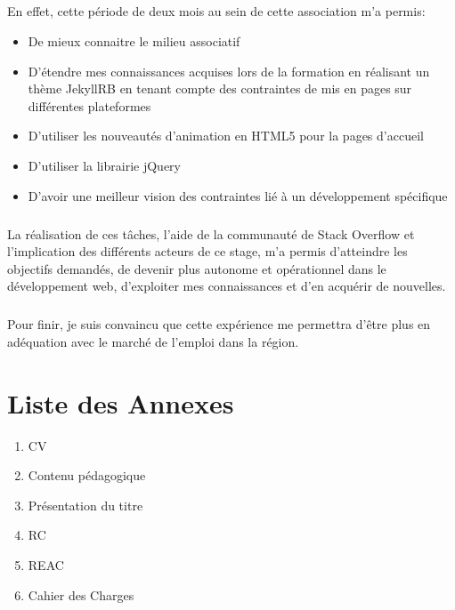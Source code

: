 \documentclass[11pt,a4paper]{report}
\begin{document}
	\paragraph*{}En effet, cette période de deux mois au sein de cette association m'a permis:
	\begin{itemize}
		\item De mieux connaitre le milieu associatif
		\item D'étendre mes connaissances acquises lors de la formation en réalisant un thème JekyllRB en tenant compte des contraintes de mis en pages sur différentes plateformes
		\item D'utiliser les nouveautés d'animation en HTML5 pour la pages d'accueil
		\item D'utiliser la librairie jQuery
		\item D'avoir une meilleur vision des contraintes lié à un développement spécifique
	\end{itemize}
	\paragraph*{}La réalisation de ces tâches, l'aide de la communauté de Stack Overflow et l'implication des différents acteurs de ce stage, m'a permis d'atteindre les objectifs demandés, de devenir plus autonome et opérationnel dans le développement web, d'exploiter mes connaissances et d'en acquérir de nouvelles.
	\paragraph*{}Pour finir, je suis convaincu que cette expérience me permettra d'être plus en adéquation avec le marché de l'emploi dans la région.

\chapter{Liste des Annexes}
	\begin{enumerate}
		\item CV
		\item Contenu pédagogique
		\item Présentation du titre
		\item RC
		\item REAC
		\item Cahier des Charges
	\end{enumerate}

\end{document}
